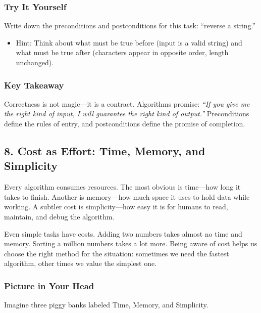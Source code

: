 \documentclass[
  letterpaper,
  DIV=11,
  numbers=noendperiod]{scrreprt}
\providecommand{\tightlist}{%
  \setlength{\itemsep}{0pt}\setlength{\parskip}{0pt}}
\begin{document}
\subsubsection{Try It Yourself}\label{try-it-yourself-6}

Write down the preconditions and postconditions for this task: ``reverse
a string.''

\begin{itemize}
\tightlist
\item
  Hint: Think about what must be true before (input is a valid string)
  and what must be true after (characters appear in opposite order,
  length unchanged).
\end{itemize}

\subsubsection{Key Takeaway}\label{key-takeaway-5}

Correctness is not magic---it is a contract. Algorithms promise:
\emph{``If you give me the right kind of input, I will guarantee the
right kind of output.''} Preconditions define the rules of entry, and
postconditions define the promise of completion.

\subsection{8. Cost as Effort: Time, Memory, and
Simplicity}\label{cost-as-effort-time-memory-and-simplicity}

Every algorithm consumes resources. The most obvious is time---how long
it takes to finish. Another is memory---how much space it uses to hold
data while working. A subtler cost is simplicity---how easy it is for
humans to read, maintain, and debug the algorithm.

Even simple tasks have costs. Adding two numbers takes almost no time
and memory. Sorting a million numbers takes a lot more. Being aware of
cost helps us choose the right method for the situation: sometimes we
need the fastest algorithm, other times we value the simplest one.

\subsubsection{Picture in Your Head}\label{picture-in-your-head-7}

Imagine three piggy banks labeled Time, Memory, and Simplicity.
\end{document}
